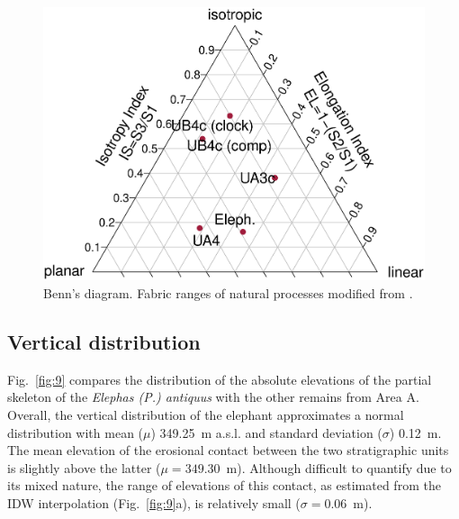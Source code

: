 \documentclass[preprint,authoryear,times]{elsarticle} %
\begin{document}
\begin{figure}[]
  \centering
  \includegraphics[width=1\textwidth]{../artwork/Fig8.eps}
  \caption{Benn's diagram. Fabric ranges of natural processes modified from \cite{Bertran1997,Lenoble2004}.}
  \label{fig:8}
\end{figure}

\subsection{Vertical distribution}



Fig.~\ref{fig:9} compares the distribution of the absolute elevations of the partial skeleton of the \emph{Elephas (P.) antiquus} with the other remains from Area A. Overall, the vertical distribution of the elephant approximates a normal distribution with mean ($\mu$) 349.25~m a.s.l. and standard deviation ($\sigma$) 0.12~m. The mean elevation of the erosional contact between the two stratigraphic units is slightly above the latter ($\mu=349.30$~m). Although difficult to quantify due to its mixed nature, the range of elevations of this contact, as estimated from the IDW interpolation (Fig.~\ref{fig:9}a), is relatively small ($\sigma=0.06$~m).
\end{document}
